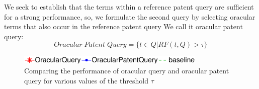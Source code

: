 We seek to establish that the terms within a reference patent query are sufficient for a strong performance, so, we formulate the second query by selecting oracular terms that also occur in the reference patent query We call it oracular patent query:
\begin{equation}
 Oracular \; Patent \; Query = \{t\in Q|RF(t, Q)>\tau\}   
 \label{eq:score}
\end{equation}
\begin{figure}[t!]
\begin{centering}
\includegraphics[width=9cm]{figs/l1}
\par\end{centering}

\begin{centering}
\hspace*{1.5cm}  
\par\end{centering} 

\protect\caption{Comparing the performance of oracular query and oracular patent query for various values of the threshold $\tau$}
\label{fig:oracularpq}
\end{figure}
